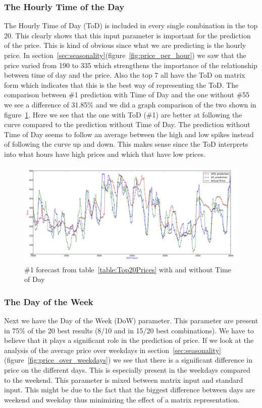 \subsubsection{The Hourly Time of the Day}
The Hourly Time of Day (ToD) is included in every single combination in the top 20. This clearly shows that this input parameter is important for the prediction of the price. This is kind of obvious since what we are predicting is the hourly price. In section~\ref{sec:seasonality}(figure~\ref{fig:price_per_hour}) we saw that the price varied from 190 to 335 which strengthens the importance of the relationship between time of day and the price. Also the top 7 all have the ToD on matrix form which indicates that this is the best way of representing the ToD. The comparison between \#1 prediction with Time of Day and the one without \#55 we see a difference of 31.85\% and we did a graph comparison of the two shown in figure~\ref{fig:dowComparison}. Here we see that the one with ToD (\#1) are better at following the curve compared to the prediction without Time of Day. The prediction without Time of Day seems to follow an average between the high and low spikes instead of following the curve up and down. This makes sense since the ToD interprets into what hours have high prices and which that have low prices.

\begin{figure}[H]
\centering
\includegraphics[width=\linewidth]{billeder/PriceExperimentalAnalysis/dowComparison.png}
\caption{\#1 forecast from table~\ref{table:Top20Prices} with and without Time of Day}
\label{fig:dowComparison}
\end{figure}

\subsubsection{The Day of the Week}
Next we have the Day of the Week (DoW) parameter. This parameter are present in 75\% of the 20 best results (8/10 and in 15/20 best combinations). We have to believe that it plays a significant role in the prediction of price. If we look at the analysis of the average price over weekdays in section~\ref{sec:seasonality}(figure~\ref{fig:price_over_weekdays}) we see that there is a significant difference in price on the different days. This is especially present in the weekdays compared to the weekend. This parameter is mixed between matrix input and standard input. This might be due to the fact that the biggest difference between days are weekend and weekday thus minimizing the effect of a matrix representation. 


